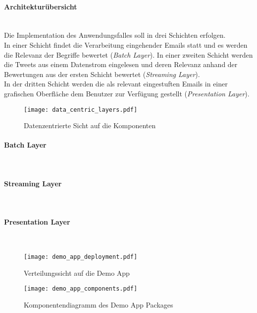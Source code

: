 \paragraph{Architekturübersicht}\\

Die Implementation des Anwendungsfalles soll in drei Schichten erfolgen. \\
In einer Schicht findet die Verarbeitung eingehender Emails statt und es werden die Relevanz der Begriffe bewertet (\textit{Batch Layer}).
In einer zweiten Schicht werden die Tweets aus einem Datenstrom eingelesen und deren Relevanz anhand der Bewertungen aus der ersten Schicht bewertet (\textit{Streaming Layer}).\\
In der dritten Schicht werden die als relevant eingestuften Emails in einer grafischen Oberfläche dem Benutzer zur Verfügung gestellt (\textit{Presentation Layer}).

\begin{figure}[ht!]
	\centering
  \texttt{[image: data\_centric\_layers.pdf]}
	\caption{Datenzentrierte Sicht auf die Komponenten}
	\label{figure:data_centrice_layers}
\end{figure}

\paragraph{Batch Layer}\\

\paragraph{Streaming Layer}\\

\paragraph{Presentation Layer}\\

\begin{figure}[ht!]
	\centering
  \texttt{[image: demo\_app\_deployment.pdf]}
	\caption{Verteilungssicht auf die Demo App}
	\label{figure:demo_app_verteilung}
\end{figure}


\begin{figure}[ht!]
	\centering
  \texttt{[image: demo\_app\_components.pdf]}
	\caption{Komponentendiagramm des Demo App Packages}
	\label{figure:demo_app_komponenten}
\end{figure}

